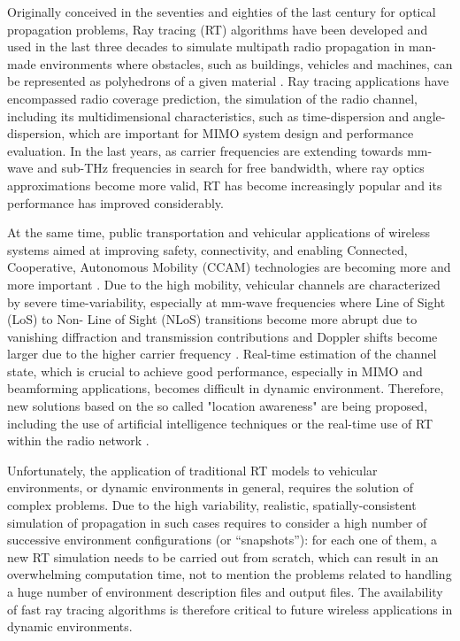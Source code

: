 Originally conceived in the seventies and eighties of the last century for optical propagation problems, Ray tracing (RT) algorithms have been developed and used in the last three decades to simulate multipath radio propagation in man-made environments where obstacles, such as buildings, vehicles and machines, can be represented as polyhedrons of a given material \cite{iskander,fuschini2019}. Ray tracing applications have encompassed radio coverage prediction, the simulation of the radio channel, including its multidimensional characteristics, such as time-dispersion and angle-dispersion, which are important for MIMO system design and performance evaluation.
In the last years, as carrier frequencies are extending towards mm-wave and sub-THz frequencies in search for free bandwidth, where ray optics approximations become more valid, RT has become increasingly popular and its performance has improved considerably.

At the same time, public transportation and vehicular applications of wireless systems aimed at improving safety, connectivity, and enabling Connected, Cooperative, Autonomous Mobility (CCAM) technologies are becoming more and more important \cite{Bhat2018}. Due to the high mobility, vehicular channels are characterized by severe time-variability, especially at mm-wave frequencies where Line of Sight (LoS) to Non- Line of Sight (NLoS) transitions become more abrupt due to vanishing diffraction and transmission contributions and Doppler shifts become larger due to the higher carrier frequency \cite{boban1}. Real-time estimation of the channel state, which is crucial to achieve good performance, especially in MIMO and beamforming applications, becomes difficult in dynamic environment. Therefore, new solutions based on the so called "location awareness" are being proposed, including the use of artificial intelligence techniques \cite{Xing2020} or the real-time use of RT within the radio network \cite{iskander,VDE2021}. 

Unfortunately, the application of traditional RT models to vehicular environments, or dynamic environments in general, requires the solution of complex problems. Due to the high variability, realistic, spatially-consistent simulation of propagation in such cases requires to consider a high number of successive environment configurations (or “snapshots”): for each one of them, a new RT simulation needs to be carried out from scratch, which can result in an overwhelming computation time, not to mention the problems related to handling a huge number of environment description files and output files. The availability of fast ray tracing algorithms is therefore critical to future wireless applications in dynamic environments. 


